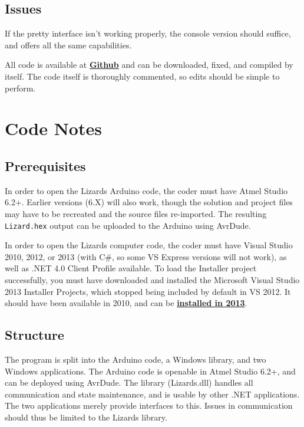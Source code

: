 \documentclass[twoside,a4paper]{refart}
\newcommand{\bhyperlink}[2]{\textbf{\href{#1}{#2}}}
\begin{document}
\subsection{Issues}

If the pretty interface isn't working properly, the console version should suffice, and offers all the same capabilities.

All code is available at \bhyperlink{https://github.com/scnerd/Lizards}{Github} and can be downloaded, fixed, and compiled by itself. The code itself is thoroughly commented, so edits should be simple to perform.

\section{Code Notes}
\label{codenotes}

\subsection{Prerequisites}

In order to open the Lizards Arduino code, the coder must have Atmel Studio 6.2+. Earlier versions (6.X) will also work, though the solution and project files may have to be recreated and the source files re-imported. The resulting \verb|Lizard.hex| output can be uploaded to the Arduino using AvrDude.

In order to open the Lizards computer code, the coder must have Visual Studio 2010, 2012, or 2013 (with C\#, so some VS Express versions will not work), as well as .NET 4.0 Client Profile available. To load the Installer project successfully, you must have downloaded and installed the Microsoft Visual Studio 2013 Installer Projects, which stopped being included by default in VS 2012. It should have been available in 2010, and can be \bhyperlink{https://visualstudiogallery.msdn.microsoft.com/9abe329c-9bba-44a1-be59-0fbf6151054d}{installed in 2013}.

\subsection{Structure}

The program is split into the Arduino code, a Windows library, and two Windows applications. The Arduino code is openable in Atmel Studio 6.2+, and can be deployed using AvrDude. The library (Lizards.dll) handles all communication and state maintenance, and is usable by other .NET applications. The two applications merely provide interfaces to this. Issues in communication should thus be limited to the Lizards library.
\end{document}
